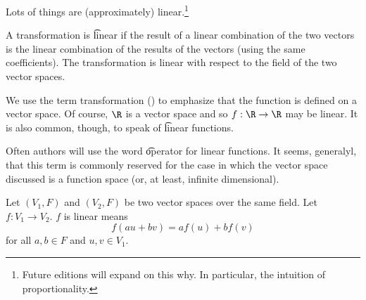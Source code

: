 

Lots of things are (approximately) linear.\footnote{Future editions will expand on this why. In particular, the intuition of proportionality.}


A transformation is \t{linear} if the result of a linear combination of the two vectors is the linear combination of the results of the vectors (using the same coefficients).
The transformation is linear with respect to the field of the two vector spaces.

We use the term transformation () to emphasize that the function is defined on a vector space.
Of course, $\R$ is a vector space and so $f: \R \to \R$ may be linear.
It is also common, though, to speak of \t{linear functions}.

Often authors will use the word \t{operator} for linear functions.
It seems, generalyl, that this term is commonly reserved for the case in which the vector space discussed is a function space (or, at least, infinite dimensional).


Let $(V_1, F)$ and $(V_2, F)$ be two vector spaces over the same field.
Let $f: V_1 \to V_2$.
$f$ is linear means
\[
  f(au + bv) = af(u) + bf(v)
\]
for all $a, b \in F$ and $u, v \in V_1$.

\blankpage
